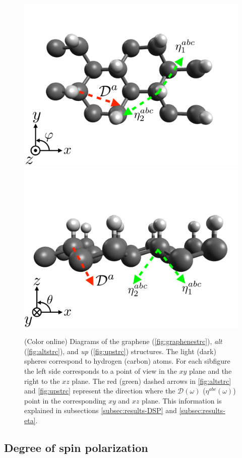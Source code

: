 \documentclass[pss]{wiley2sp} %
\begin{document}
\begin{figure}[t]
{\includegraphics[width=0.49\linewidth]{figures/up1}
 \includegraphics[width=0.49\linewidth]{figures/up2}\label{fig:upstrc}}
\caption{(Color online) Diagrams of the graphene (\ref{fig:graphenestrc}), \emph{alt} (\ref{fig:altstrc}), and \emph{up} (\ref{fig:upstrc}) structures. The light (dark) spheres correspond to hydrogen (carbon) atoms. For each sibfigure the left side corresponds to a point of view in the $xy$ plane and the right to the $xz$ plane. The red (green) dashed arrows in \ref{fig:altstrc} and \ref{fig:upstrc} represent the direction where the $\mathcal{D}(\omega)$ ($\eta^{abc}(\omega)$) point in the corresponding $xy$ and $xz$ plane. This information is explained in subsections \ref{subsec:results-DSP} and \ref{subsec:results-eta}.\label{fig:structures}}
\end{figure}

\subsection{Degree of spin polarization}
\end{document}
